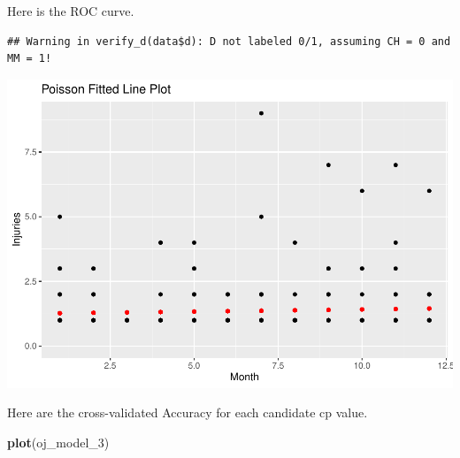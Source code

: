 \documentclass[]{book}
\newenvironment{Shaded}{\begin{snugshade}}{\end{snugshade}}
\newcommand{\DataTypeTok}[1]{\textcolor[rgb]{0.13,0.29,0.53}{#1}}
\newcommand{\DecValTok}[1]{\textcolor[rgb]{0.00,0.00,0.81}{#1}}
\newcommand{\FloatTok}[1]{\textcolor[rgb]{0.00,0.00,0.81}{#1}}
\newcommand{\KeywordTok}[1]{\textcolor[rgb]{0.13,0.29,0.53}{\textbf{#1}}}
\newcommand{\NormalTok}[1]{#1}
\newcommand{\OperatorTok}[1]{\textcolor[rgb]{0.81,0.36,0.00}{\textbf{#1}}}
\newcommand{\StringTok}[1]{\textcolor[rgb]{0.31,0.60,0.02}{#1}}
\begin{document}
Here is the ROC curve.

\begin{Shaded}
\end{Shaded}

\begin{verbatim}
## Warning in verify_d(data$d): D not labeled 0/1, assuming CH = 0 and MM = 1!
\end{verbatim}

\includegraphics{data-sci_files/figure-latex/unnamed-chunk-52-1.pdf}

Here are the cross-validated Accuracy for each candidate cp value.

\begin{Shaded}
\begin{Highlighting}[]
\KeywordTok{plot}\NormalTok{(oj_model_}\DecValTok{3}\NormalTok{)}
\end{Highlighting}
\end{Shaded}
\end{document}
